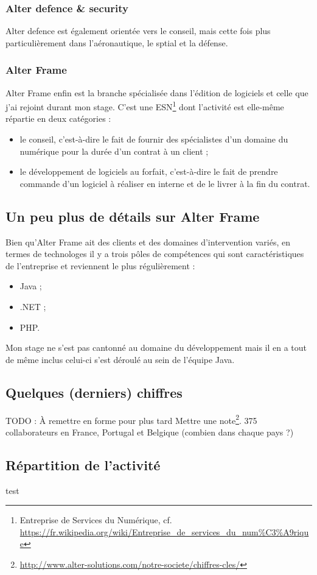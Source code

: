 \subsubsection{Alter defence \& security}
Alter defence est également orientée vers le conseil, mais cette fois plus particulièrement dans l'aéronautique, le sptial et la défense.
  
\subsubsection{Alter Frame}
Alter Frame enfin est la branche spécialisée dans l'édition de logiciels et celle que j'ai rejoint durant mon stage. C'est une ESN\footnote{Entreprise de Services du Numérique, cf. \url{https://fr.wikipedia.org/wiki/Entreprise_de_services_du_num\%C3\%A9rique}} dont l'activité est elle-même répartie en deux catégories :
\begin{itemize}[label=$\bullet$]
\item le conseil, c'est-à-dire le fait de fournir des spécialistes d'un domaine du numérique pour la durée d'un contrat à un client ;
\item le développement de logiciels au forfait, c'est-à-dire le fait de prendre commande d'un logiciel à réaliser en interne et de le livrer à la fin du contrat.
\end{itemize}

\subsection{Un peu plus de détails sur Alter Frame}
\label{subsec:frame}
Bien qu'Alter Frame ait des clients et des domaines d'intervention variés, en termes de technologes il y a trois pôles de compétences qui sont caractéristiques de l'entreprise et reviennent le plus régulièrement :
\begin{itemize}[label=$\bullet$]
\item Java ;
\item .NET ;
\item PHP.
\end{itemize}

Mon stage ne s'est pas cantonné au domaine du développement mais il en a tout de même inclus celui-ci s'est déroulé au sein de l'équipe Java.
    
\subsection{Quelques (derniers) chiffres}
TODO : À remettre en forme pour plus tard
Mettre une note\footnote{\url{http://www.alter-solutions.com/notre-societe/chiffres-cles/}}.
375 collaborateurs en France, Portugal et Belgique (combien dans chaque pays ?)

\subsection{Répartition de l'activité}
test